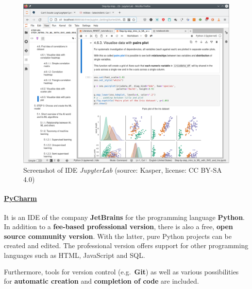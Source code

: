 \documentclass [oneside,10pt,a4paper,ngerman,BCOR10mm,headsepline,parindent,final]{scrartcl}
\begin{document}
\begin{figure}
\centering
\includegraphics{images/Screenshot_JupyterLab.png}
\caption{Screenshot of IDE \emph{JupyterLab} (source: Kasper, license:
CC BY-SA 4.0)}
\end{figure}

    \hypertarget{pycharm}{%
\paragraph{\texorpdfstring{\href{https://de.wikipedia.org/wiki/PyCharm}{PyCharm}}{PyCharm}}\label{pycharm}}

It is an IDE of the company \textbf{JetBrains} for the programming
language \textbf{Python}. In addition to a \textbf{fee-based
professional version}, there is also a free, \textbf{open source
community version}. With the latter, pure Python projects can be created
and edited. The professional version offers support for other
programming languages such as HTML, JavaScript and SQL.

Furthermore, tools for version control (e.g.~\textbf{Git}) as well as
various possibilities for \textbf{automatic creation} and
\textbf{completion of code} are included.
\end{document}
